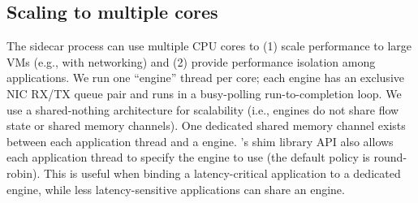 

\subsection{Scaling to multiple cores}
\label{subsec:multicore}
The \mt{} sidecar process can use multiple CPU cores to (1) scale performance to large VMs (e.g., with  networking) and (2) provide performance isolation among applications.
We run one \mt{} ``engine'' thread per core; each engine has an exclusive NIC RX/TX queue pair and runs in a busy-polling run-to-completion loop.
We use a shared-nothing architecture for scalability (i.e., engines do not share flow state or shared memory channels).
One dedicated shared memory channel exists between each application thread and a \mt{} engine.
\mt{}'s shim library API also allows each application thread to specify the engine to use (the default policy is round-robin).
This is useful when binding a latency-critical application to a dedicated engine, while less latency-sensitive applications can share an engine.

